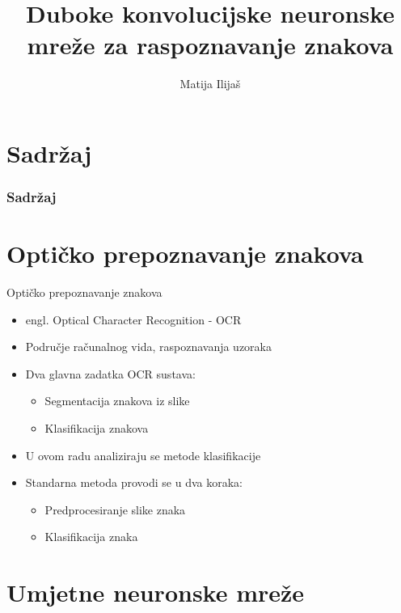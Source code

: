 \documentclass[pdf]{beamer}
\title{Duboke konvolucijske neuronske mreže za raspoznavanje znakova}
\author{Matija Ilijaš}
\begin{document}
\begin{frame}
\titlepage
\end{frame}

\section*{Sadržaj}
\begin{frame}
 \frametitle{Sadržaj}
 \tableofcontents[]%
\end{frame}


\section{Optičko prepoznavanje znakova}

\begin{frame}{Optičko prepoznavanje znakova}

\begin{itemize}
\setlength\itemsep{0.5em}
	\item engl. Optical Character Recognition - OCR

	\item  Područje računalnog vida, raspoznavanja uzoraka 
	
 	\item  Dva glavna zadatka OCR sustava: 
	 \begin{itemize}
	 	\item Segmentacija znakova iz slike
	 	\item  Klasifikacija znakova
	\end{itemize}
	
 	\item U ovom radu analiziraju se metode klasifikacije
 	
 	\item Standarna metoda provodi se u dva koraka:
 	 \begin{itemize}
	 	\item Predprocesiranje slike znaka
	 	\item  Klasifikacija znaka
	\end{itemize}
 	
\end{itemize}

\end{frame}


\section{Umjetne neuronske mreže}
\end{document}
